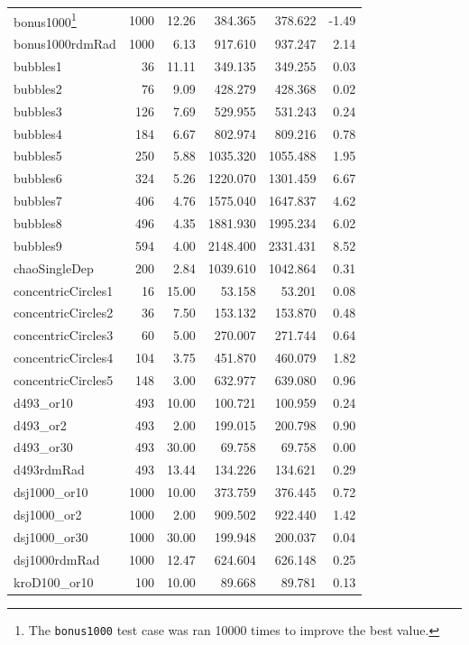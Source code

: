 \documentclass[11pt]{article}
\begin{document}
\begin{longtable}{lrrrrr}
\hline
\endlastfoot
bonus1000\footnote{The \texttt{bonus1000} test case was ran 10000 times to improve the best value.} & 1000 & 12.26 & 384.365 & 378.622 & -1.49 \\
bonus1000rdmRad & 1000 & 6.13 & 917.610 & 937.247 & 2.14 \\
bubbles1 & 36 & 11.11 & 349.135 & 349.255 & 0.03 \\
bubbles2 & 76 & 9.09 & 428.279 & 428.368 & 0.02 \\
bubbles3 & 126 & 7.69 & 529.955 & 531.243 & 0.24 \\
bubbles4 & 184 & 6.67 & 802.974 & 809.216 & 0.78 \\
bubbles5 & 250 & 5.88 & 1035.320 & 1055.488 & 1.95 \\
bubbles6 & 324 & 5.26 & 1220.070 & 1301.459 & 6.67 \\
bubbles7 & 406 & 4.76 & 1575.040 & 1647.837 & 4.62 \\
bubbles8 & 496 & 4.35 & 1881.930 & 1995.234 & 6.02 \\
bubbles9 & 594 & 4.00 & 2148.400 & 2331.431 & 8.52 \\
chaoSingleDep & 200 & 2.84 & 1039.610 & 1042.864 & 0.31 \\
concentricCircles1 & 16 & 15.00 & 53.158 & 53.201 & 0.08 \\
concentricCircles2 & 36 & 7.50 & 153.132 & 153.870 & 0.48 \\
concentricCircles3 & 60 & 5.00 & 270.007 & 271.744 & 0.64 \\
concentricCircles4 & 104 & 3.75 & 451.870 & 460.079 & 1.82 \\
concentricCircles5 & 148 & 3.00 & 632.977 & 639.080 & 0.96 \\
d493\_or10 & 493 & 10.00 & 100.721 & 100.959 & 0.24 \\
d493\_or2 & 493 & 2.00 & 199.015 & 200.798 & 0.90 \\
d493\_or30 & 493 & 30.00 & 69.758 & 69.758 & 0.00 \\
d493rdmRad & 493 & 13.44 & 134.226 & 134.621 & 0.29 \\
dsj1000\_or10 & 1000 & 10.00 & 373.759 & 376.445 & 0.72 \\
dsj1000\_or2 & 1000 & 2.00 & 909.502 & 922.440 & 1.42 \\
dsj1000\_or30 & 1000 & 30.00 & 199.948 & 200.037 & 0.04 \\
dsj1000rdmRad & 1000 & 12.47 & 624.604 & 626.148 & 0.25 \\
kroD100\_or10 & 100 & 10.00 & 89.668 & 89.781 & 0.13 \\

\end{longtable}
\end{document}
